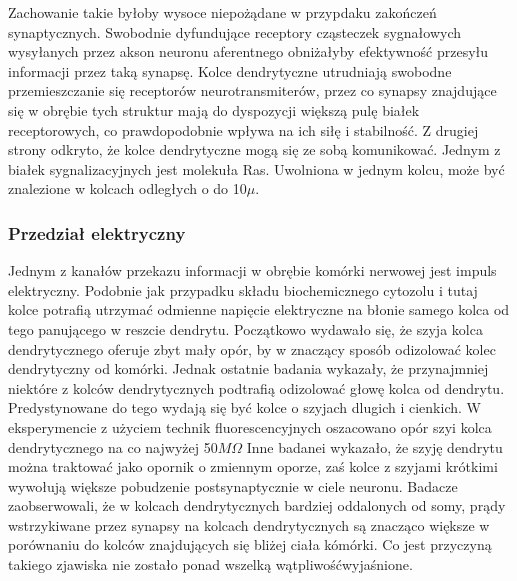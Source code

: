 \documentclass{article}
\begin{document}
Zachowanie takie byłoby wysoce niepożądane w przypdaku zakończeń synaptycznych. 
Swobodnie dyfundujące receptory cząsteczek sygnałowych wysyłanych przez akson neuronu aferentnego obniżałyby efektywność przesyłu informacji przez taką synapsę. 
Kolce dendrytyczne utrudniają swobodne przemieszczanie się receptorów neurotransmiterów, przez co synapsy znajdujące się w obrębie tych struktur mają do dyspozycji większą pulę białek receptorowych, co prawdopodobnie wpływa na ich siłę i stabilność.
Z drugiej strony odkryto, że kolce dendrytyczne mogą się ze sobą komunikować.
Jednym z białek sygnalizacyjnych jest molekuła Ras.
Uwolniona w jednym kolcu, może być znalezione w kolcach odległych o do 10\(\mu\).

\subsubsection{Przedział elektryczny}
Jednym z kanałów przekazu informacji w obrębie komórki nerwowej jest impuls elektryczny.
Podobnie jak przypadku składu biochemicznego cytozolu i tutaj kolce potrafią utrzymać odmienne napięcie elektryczne na błonie samego kolca od tego panującego w reszcie dendrytu.
Początkowo wydawało się, że szyja kolca dendrytycznego oferuje zbyt mały opór, by w znaczący sposób odizolować kolec dendrytyczny od komórki. 
Jednak ostatnie badania wykazały, że przynajmniej niektóre z kolców dendrytycznych podtrafią odizolować głowę kolca od dendrytu.
Predystynowane do tego wydają się być kolce o szyjach dlugich i cienkich.
W eksperymencie z użyciem technik fluorescencyjnych oszacowano opór szyi kolca dendrytycznego na co najwyżej 50\(M\Omega\)
Inne badanei wykazało, że szyję dendrytu można traktować jako opornik o zmiennym oporze, zaś kolce z szyjami krótkimi wywołują większe pobudzenie postsynaptycznie w ciele neuronu.
Badacze zaobserwowali, że w kolcach dendrytycznych bardziej oddalonych od somy, prądy wstrzykiwane przez synapsy na kolcach dendrytycznych są znacząco większe w porównaniu do kolców znajdujących się bliżej ciała kómórki.
Co jest przyczyną takiego zjawiska nie zostało ponad wszelką wątpliwośćwyjaśnione\citep{Sala2014}.
\end{document}
